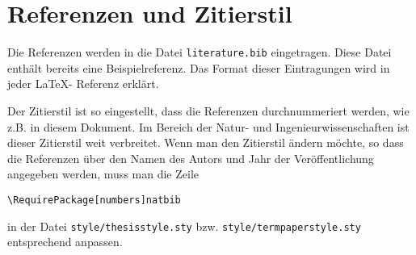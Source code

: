 %
\section{Referenzen und Zitierstil}
Die Referenzen werden in die Datei \texttt{literature.bib} eingetragen. Diese Datei
enthält bereits eine Beispielreferenz. Das Format dieser Eintragungen wird in
jeder \LaTeX - Referenz erklärt.

Der Zitierstil ist so eingestellt, dass die Referenzen durchnummeriert werden,
wie z.B. in diesem Dokument.
Im Bereich der Natur- und Ingenieurwissenschaften ist dieser Zitierstil weit
verbreitet. Wenn man den Zitierstil ändern möchte, so dass die Referenzen über
den Namen des Autors und Jahr der Veröffentlichung angegeben werden, muss man
die Zeile
\begin{center}
  \texttt{\textbackslash RequirePackage[numbers]{natbib}}
\end{center}
in der Datei \texttt{style/thesisstyle.sty} bzw. \texttt{style/termpaperstyle.sty}  entsprechend anpassen.
